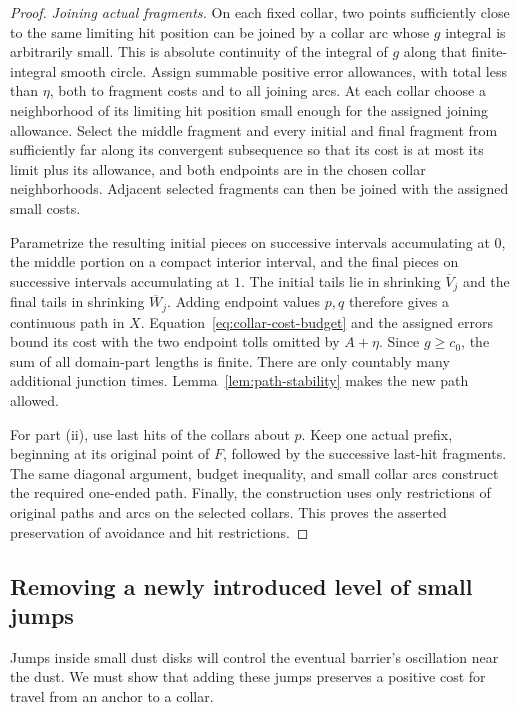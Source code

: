 \begin{proof}
\emph{Joining actual fragments.}
On each fixed collar, two points sufficiently close to the same
limiting hit position can be joined by a collar arc whose $g$ integral
is arbitrarily small.  This is absolute continuity of the integral
of $g$ along that finite-integral smooth circle.  Assign summable
positive error allowances, with total less than $\eta$, both to
fragment costs and to all joining arcs.  At each collar choose a
neighborhood of its limiting hit position small enough for the
assigned joining allowance.  Select the middle fragment and every
initial and final fragment from sufficiently far along its convergent
subsequence so that its cost is at most its limit plus its allowance,
and both endpoints are in the chosen collar neighborhoods.  Adjacent
selected fragments can then be joined with the assigned small costs.

Parametrize the resulting initial pieces on successive intervals
accumulating at $0$, the middle portion on a compact interior interval,
and the final pieces on successive intervals accumulating at $1$.
The initial tails lie in shrinking $\overline V_j$ and the final tails
in shrinking $\overline W_j$.  Adding endpoint values $p,q$ therefore
gives a continuous path in $X$.  Equation~\eqref{eq:collar-cost-budget}
and the assigned errors bound its cost with the two endpoint tolls
omitted by $A+\eta$.  Since $g\ge c_0$, the sum of all domain-part
lengths is finite.  There are only countably many additional junction
times.  Lemma~\ref{lem:path-stability} makes the new path allowed.

For part \textup{(ii)}, use last hits of the collars about $p$.  Keep
one actual prefix, beginning at its original point of $F$, followed
by the successive last-hit fragments.  The same diagonal argument,
budget inequality, and small collar arcs construct the required
one-ended path.  Finally, the construction uses only restrictions
of original paths and arcs on the selected collars.  This proves
the asserted preservation of avoidance and hit restrictions.
\end{proof}

\subsection{Removing a newly introduced level of small jumps}

Jumps inside small dust disks will control the eventual barrier's
oscillation near the dust.  We must show that adding these jumps
preserves a positive cost for travel from an anchor to a collar.

